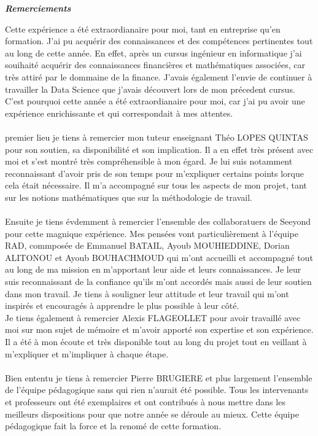 \newpage
\thispagestyle{empty}
\onehalfspacing
\null
	\begin{center}
  \LARGE \textit{\textbf{Remerciements}}
 \end{center}
 \vspace{2cm}

Cette expérience a été extraordianaire pour moi, tant en entreprise qu'en formation. J'ai pu acquérir des connaissances et des compétences pertinentes tout au long de cette année. En effet, après un cursus ingénieur en informatique j'ai souihaité acquérir des connaissances financières et mathématiques associées, car très attiré par le dommaine de la finance. J'avais également l'envie de continuer à travailler la Data Science que j'avais découvert lors de mon précedent cursus. 
\\
C'est pourquoi cette année a été extraordianaire pour moi, car j'ai pu avoir une expérience enrichissante et qui correspondait à mes attentes.
\\
\\
premier lieu je tiens à remercier mon tuteur enseignant Théo LOPES QUINTAS pour son soutien, sa disponibilité et son implication. Il a en effet très présent avec moi et s'est montré très compréhensible à mon égard. Je lui suis notamment reconnaissant d'avoir pris de son temps pour m'expliquer certains points lorque cela était nécessaire. Il m'a accompagné sur tous les aspects de mon projet, tant sur les notions mathématiques que sur la méthodologie de travail.
\\
\\
Ensuite je tiens évdemment à remercier l'ensemble des collaboratuers de Seeyond pour cette magnique expérience. Mes pensées vont particulièrement à l'équipe RAD, commposée de Emmanuel BATAIL, Ayoub MOUHIEDDINE, Dorian ALITONOU et Ayoub BOUHACHMOUD qui m'ont accueilli et accompagné tout au long de ma mission en m'apportant leur aide et leurs connaissances. Je leur suis reconnaissant de la confiance qu'ils m'ont accordés mais aussi de leur soutien dans mon travail. Je tiens à souligner leur attitude et leur travail qui m'ont inspirés et encouragés à apprendre le plus possible à leur côté.
\\
Je tiens également à remercier Alexis FLAGEOLLET pour avoir travaillé avec moi sur mon sujet de mémoire et m'avoir apporté son expertise et son expérience. Il a été à mon écoute et très disponible tout au long du projet tout en veillant à m'expliquer et m'impliquer à chaque étape.
\\
\\
Bien ententu je tiens à remercier Pierre BRUGIERE et plus largement l'ensemble de l'équipe pédagogique sans qui rien n'aurait été possible. Tous les intervenants et professeurs ont été exemplaires et ont contribués à nous mettre dans les meilleurs dispositions pour que notre année se déroule au mieux. Cette équipe pédagogique fait la force et la renomé de cette formation.

\newpage
\thispagestyle{empty}



\newpage